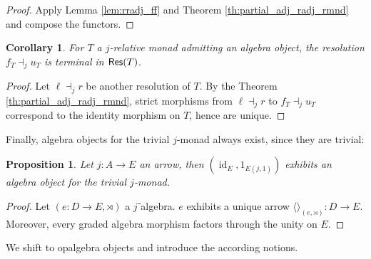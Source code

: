 \documentclass[10pt,a4paper]{article}
\newcommand{\cat}[1]{\textcat{#1}}
\newcommand{\textcat}[1]{{\normalfont\textsf{#1}}}
\newcommand{\tp}[1]{\langle#1\rangle}
\newcommand{\unit}{{\tp{}}}
\DeclareMathOperator{\id}{id}
\theoremstyle{plain}
\newtheorem{proposition}[theorem]{Proposition}
\newtheorem{corollary}[theorem]{Corollary}
\theoremstyle{definition}
\theoremstyle{remark}
\begin{document}
\begin{proof}
    Apply Lemma \ref{lem:rradj_ff} and Theorem \ref{th:partial_adj_radj_rmnd} and compose the functors.
\end{proof}

\begin{corollary}
    \label{cor:rmnd_res_termi}
    For $T$ a $j$-relative monad admitting an algebra object, the resolution $f_T\dashv_ju_T$ is terminal in $\cat{Res}(T)$.
\end{corollary}

\begin{proof}
    Let $\ell\dashv_jr$ be another resolution of $T$. By the Theorem \ref{th:partial_adj_radj_rmnd}, strict morphisms from $\ell\dashv_jr$ to $f_T\dashv_ju_T$ correspond to the identity morphism on $T$, hence are unique.
\end{proof}

Finally, algebra objects for the trivial $j$-monad always exist, since they are trivial:

\begin{proposition}
    \label{prop:triv_rmnd_alg}
    Let $j : A \to E$ an arrow, then $(\id_E, 1_{E(j, 1)})$ exhibits an algebra object for the trivial $j$-monad.
\end{proposition}

\begin{proof}
    Let $(e : D \to E, \rtimes)$ a $j$⁻algebra. $e$ exhibits a unique arrow $\unit_{(e, \rtimes)} : D \to E$. Moreover, every graded algebra morphism factors through the unity on $E$.
\end{proof}

We shift to opalgebra objects and introduce the according notions.
\end{document}
